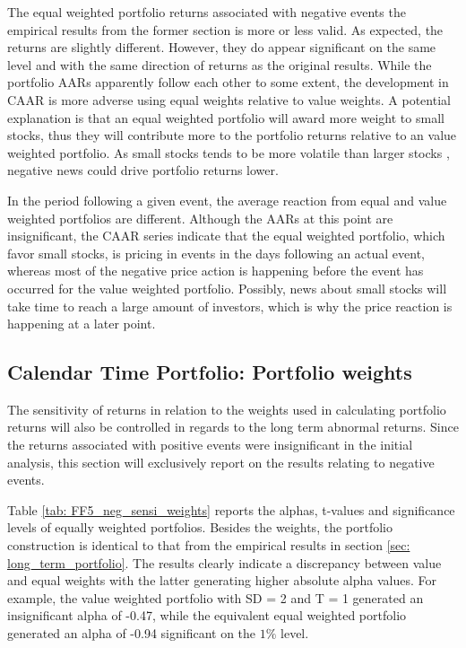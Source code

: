 The equal weighted portfolio returns associated with negative events the empirical results from the former section is more or less valid. As expected, the returns are slightly different. However, they do appear significant on the same level and with the same direction of returns as the original results. While the portfolio AARs apparently follow each other to some extent, the development in CAAR is more adverse using equal weights relative to value weights. A potential explanation is that an equal weighted portfolio will award more weight to small stocks, thus they will contribute more to the portfolio returns relative to an value weighted portfolio. As small stocks tends to be more volatile than larger stocks \cite{Fama_french_3fac}, negative news could drive portfolio returns lower. 



In the period following a given event, the average reaction from equal and value weighted portfolios are different. Although the AARs at this point are insignificant, the CAAR series indicate that the equal weighted portfolio, which favor small stocks, is pricing in events in the days following an actual event, whereas most of the negative price action is happening before the event has occurred for the value weighted portfolio. Possibly, news about small stocks will take time to reach a large amount of investors, which is why the price reaction is happening at a later point. 




\subsection{Calendar Time Portfolio: Portfolio weights}

The sensitivity of returns in relation to the weights used in calculating portfolio returns will also be controlled in regards to the long term abnormal returns. Since the returns associated with positive events were insignificant in the initial analysis, this section will exclusively report on the results relating to negative events. 

Table \ref{tab: FF5_neg_sensi_weights} reports the alphas, t-values and significance levels of equally weighted portfolios. Besides the weights, the portfolio construction is identical to that from the empirical results in section \ref{sec: long_term_portfolio}. The results clearly indicate a discrepancy between value and equal weights with the latter generating higher absolute alpha values. For example, the value weighted portfolio with SD = 2 and T = 1 generated an insignificant alpha of -0.47, while the equivalent equal weighted portfolio generated an alpha of -0.94 significant on the $1\%$ level.   

